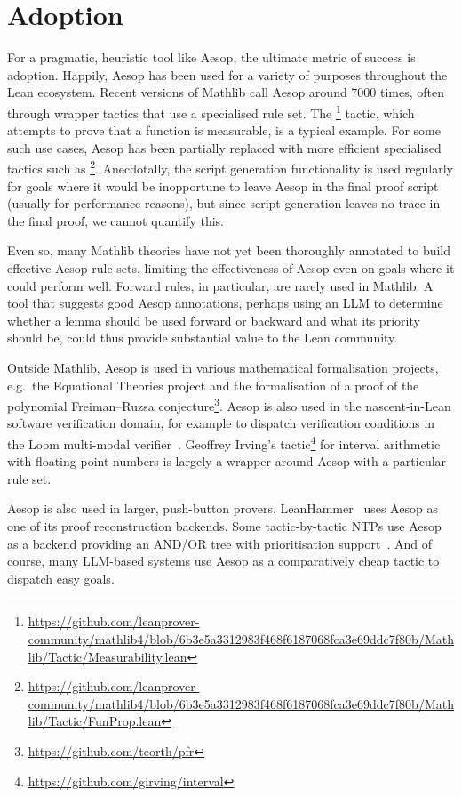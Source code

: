 \section{Adoption}

For a pragmatic, heuristic tool like Aesop, the ultimate metric of success is adoption.
Happily, Aesop has been used for a variety of purposes throughout the Lean ecosystem.
Recent versions of Mathlib call Aesop around 7000 times, often through wrapper tactics that use a specialised rule set.
The \footnote{\url{https://github.com/leanprover-community/mathlib4/blob/6b3e5a3312983f468f6187068fca3e69ddc7f80b/Mathlib/Tactic/Measurability.lean}} tactic, which attempts to prove that a function is measurable, is a typical example.
For some such use cases, Aesop has been partially replaced with more efficient specialised tactics such as \footnote{\url{https://github.com/leanprover-community/mathlib4/blob/6b3e5a3312983f468f6187068fca3e69ddc7f80b/Mathlib/Tactic/FunProp.lean}}.
Anecdotally, the script generation functionality is used regularly for goals where it would be inopportune to leave Aesop in the final proof script (usually for performance reasons), but since script generation leaves no trace in the final proof, we cannot quantify this.

Even so, many Mathlib theories have not yet been thoroughly annotated to build effective Aesop rule sets, limiting the effectiveness of Aesop even on goals where it could perform well.
Forward rules, in particular, are rarely used in Mathlib.
A tool that suggests good Aesop annotations, perhaps using an LLM to determine whether a lemma should be used forward or backward and what its priority should be, could thus provide substantial value to the Lean community.

Outside Mathlib, Aesop is used in various mathematical formalisation projects, e.g.\ the Equational Theories project \cite{EquationalTheories} and the formalisation of a proof of the polynomial Freiman--Ruzsa conjecture\footnote{\url{https://github.com/teorth/pfr}}.
Aesop is also used in the nascent-in-Lean software verification domain, for example to dispatch verification conditions in the Loom multi-modal verifier~\cite{Loom}.
Geoffrey Irving's  tactic\footnote{\url{https://github.com/girving/interval}} for interval arithmetic with floating point numbers is largely a wrapper around Aesop with a particular rule set.

Aesop is also used in larger, push-button provers.
LeanHammer~\cite{LeanHammer} uses Aesop as one of its proof reconstruction backends.
Some tactic-by-tactic NTPs use Aesop as a backend providing an AND/OR tree with prioritisation support~\cite{LeanDojo,ABEL}.
And of course, many LLM-based systems use Aesop as a comparatively cheap tactic to dispatch easy goals.

